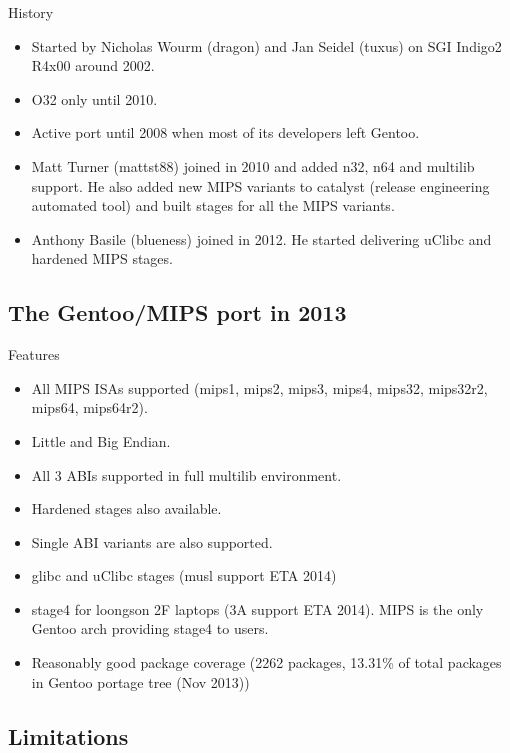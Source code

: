 \documentclass{beamer}
\begin{document}
\begin{frame}{History}
	\begin{itemize}
		\item Started by Nicholas Wourm (dragon) and Jan Seidel (tuxus) on SGI Indigo2 R4x00 around 2002.
		\item O32 only until 2010.
		\item Active port until 2008 when most of its developers left Gentoo.
		\item Matt Turner (mattst88) joined in 2010 and added n32, n64 and multilib support. He also added new MIPS variants to catalyst (release engineering automated tool) and built stages for all the MIPS
	variants.
		\item Anthony Basile (blueness) joined in 2012. He started delivering uClibc and hardened MIPS stages.
	\end{itemize}
\end{frame}

\subsection{The Gentoo/MIPS port in 2013}

\begin{frame}{Features}
	\begin{itemize}
		\item All MIPS ISAs supported (mips1, mips2, mips3, mips4, mips32, mips32r2, mips64, mips64r2).
		\item Little and Big Endian.
		\item All 3 ABIs supported in full multilib environment.
		\item Hardened stages also available.
		\item Single ABI variants are also supported.
		\item glibc and uClibc stages (musl support ETA 2014)
		\item stage4 for loongson 2F laptops (3A support ETA 2014). MIPS is the only Gentoo arch providing stage4 to users.
		\item Reasonably good package coverage (2262 packages, 13.31\% of total packages in Gentoo portage tree (Nov 2013))
	\end{itemize}
\end{frame}

\subsection{Limitations}
\end{document}
